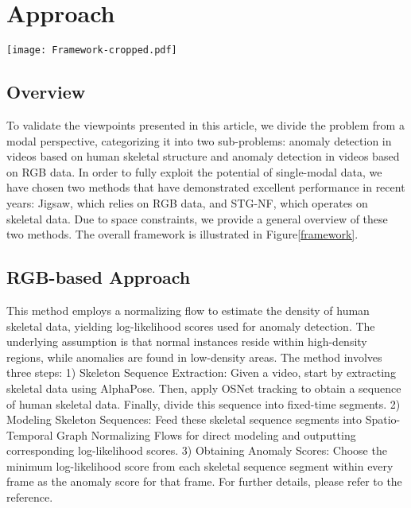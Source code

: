 \documentclass[conference]{IEEEtran}
\begin{document}
\section{Approach}

\begin{figure*}[htbp]
\texttt{[image: Framework-cropped.pdf]}
\caption{Method overview: The approach consists of two branches. One branch employs video data processed through a target detection mechanism for anomaly identification, while the other branch leverages skeletal data modeling for anomaly detection. Ultimately, the results from both branches are ensemble-aggregated to derive the conclusive anomaly detection outcomes.}
\label{framework}
\end{figure*}

\subsection{Overview}
To validate the viewpoints presented in this article, we divide the problem from a modal perspective, categorizing it into two sub-problems: anomaly detection in videos based on human skeletal structure and anomaly detection in videos based on RGB data. In order to fully exploit the potential of single-modal data, we have chosen two methods that have demonstrated excellent performance in recent years: Jigsaw\cite{jigsaw}, which relies on RGB data, and STG-NF\cite{STG-NF}, which operates on skeletal data. Due to space constraints, we provide a general overview of these two methods. The overall framework is illustrated in Figure\ref{framework}.

\subsection{RGB-based Approach}
This method employs a normalizing flow to estimate the density of human skeletal data, yielding log-likelihood scores used for anomaly detection. The underlying assumption is that normal instances reside within high-density regions, while anomalies are found in low-density areas. The method involves three steps: 1) Skeleton Sequence Extraction: Given a video, start by extracting skeletal data using AlphaPose\cite{li2019alphapose}. Then, apply OSNet\cite{osnet} tracking to obtain a sequence of human skeletal data. Finally, divide this sequence into fixed-time segments. 2) Modeling Skeleton Sequences: Feed these skeletal sequence segments into Spatio-Temporal Graph Normalizing Flows for direct modeling and outputting corresponding log-likelihood scores. 3) Obtaining Anomaly Scores: Choose the minimum log-likelihood score from each skeletal sequence segment within every frame as the anomaly score for that frame. For further details, please refer to the reference\cite{STG-NF}.
\end{document}
